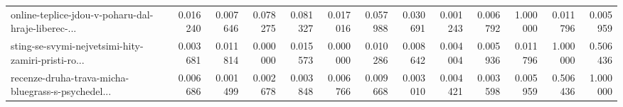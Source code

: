 \begin{tabular}{lrrrrrrrrrrrr}
online-teplice-jdou-v-poharu-dal-hraje-liberec-... &                                           0.016240 &                                           0.007646 &                                           0.078275 &                                           0.081327 &                                           0.017016 &                                           0.057988 &                                           0.030691 &                                     0.001243 &                                           0.006792 &                                           1.000000 &                                           0.011796 &                                           0.005959 \\
sting-se-svymi-nejvetsimi-hity-zamiri-pristi-ro... &                                           0.003681 &                                           0.011814 &                                           0.000000 &                                           0.015573 &                                           0.000000 &                                           0.010286 &                                           0.008642 &                                     0.004004 &                                           0.005936 &                                           0.011796 &                                           1.000000 &                                           0.506436 \\
recenze-druha-trava-micha-bluegrass-s-psychedel... &                                           0.006686 &                                           0.001499 &                                           0.002678 &                                           0.003848 &                                           0.006766 &                                           0.009668 &                                           0.003010 &                                     0.004421 &                                           0.003598 &                                           0.005959 &                                           0.506436 &                                           1.000000 \\
\bottomrule
\end{tabular}
